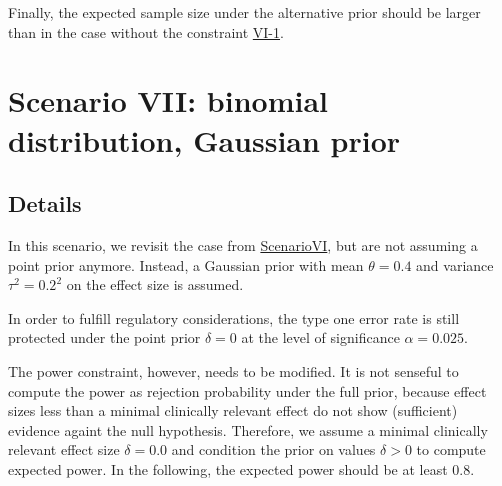 \documentclass[
]{book}
\newenvironment{Shaded}{\begin{snugshade}}{\end{snugshade}}
\newcommand{\DecValTok}[1]{\textcolor[rgb]{0.00,0.00,0.81}{#1}}
\newcommand{\FunctionTok}[1]{\textcolor[rgb]{0.00,0.00,0.00}{#1}}
\newcommand{\NormalTok}[1]{#1}
\newcommand{\SpecialCharTok}[1]{\textcolor[rgb]{0.00,0.00,0.00}{#1}}
\newcommand{\StringTok}[1]{\textcolor[rgb]{0.31,0.60,0.02}{#1}}
\begin{document}
Finally, the expected sample size under the alternative prior should be larger than in the case without the constraint \protect\hyperlink{ux5cux23variantVI_1}{VI-1}.

\begin{Shaded}
\end{Shaded}

\hypertarget{scenarioVII}{%
\chapter{Scenario VII: binomial distribution, Gaussian prior}\label{scenarioVII}}

\hypertarget{details-6}{%
\section{Details}\label{details-6}}

In this scenario, we revisit the case from \protect\hyperlink{variantVI}{ScenarioVI}, but are not assuming a point prior anymore. Instead, a Gaussian prior with mean \(\theta = 0.4\) and variance \(\tau^2 = 0.2^2\) on the effect size is assumed.

In order to fulfill regulatory considerations, the type one error rate is still protected under the point prior \(\delta=0\) at the level of significance \(\alpha=0.025\).

The power constraint, however, needs to be modified. It is not senseful to compute the power as rejection probability under the full prior, because effect sizes less than a minimal clinically relevant effect do not show (sufficient) evidence againt the null hypothesis. Therefore, we assume a minimal clinically relevant effect size \(\delta=0.0\) and condition the prior on values \(\delta>0\) to compute expected power. In the following, the expected power should be at least \(0.8\).
\end{document}
